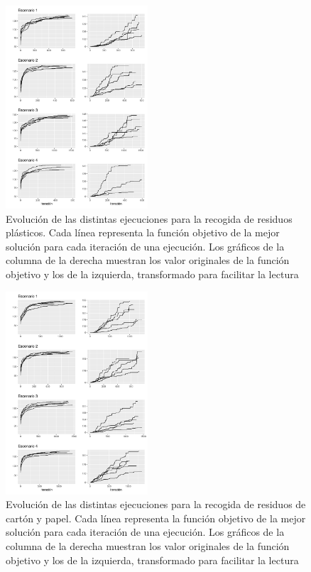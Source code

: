 \documentclass[
]{article}
\begin{document}
\begin{figure}
\includegraphics[width=200px]{fig/mixed} \caption{\label{fig:mixed}Evolución de las distintas ejecuciones para la recogida de residuos plásticos. Cada línea representa la función objetivo de la mejor solución para cada iteración de una ejecución. Los gráficos de la columna de la derecha muestran los valor originales de la función objetivo y los de la izquierda, transformado para facilitar la lectura}\label{fig:unnamed-chunk-1}
\end{figure}

\begin{figure}
\includegraphics[width=200px]{fig/paper} \caption{\label{fig:paper}Evolución de las distintas ejecuciones para la recogida de residuos de cartón y papel. Cada línea representa la función objetivo de la mejor solución para cada iteración de una ejecución. Los gráficos de la columna de la derecha muestran los valor originales de la función objetivo y los de la izquierda, transformado para facilitar la lectura}\label{fig:unnamed-chunk-2}
\end{figure}
\end{document}
